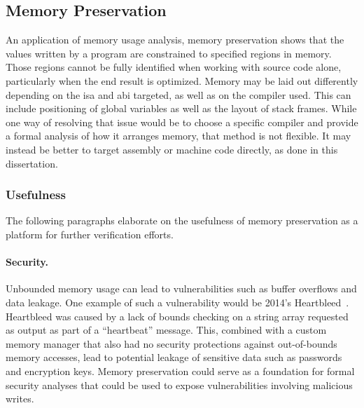 \subsection{Memory Preservation}
An application of memory usage analysis,
memory preservation shows that the values written by a program%
are constrained to specified regions in memory.
Those regions cannot be fully identified when working with source code alone,
particularly when the end result is optimized.
Memory may be laid out differently depending on the \ac{isa} and \ac{abi} targeted,
as well as on the compiler used.
This can include positioning of global variables
as well as the layout of stack frames.
While one way of resolving that issue would be to choose a specific compiler
and provide a formal analysis of how it arranges memory, that method is not flexible.
It may instead be better to target assembly or machine code directly,
as done in this dissertation.

\subsubsection{Usefulness}
The following paragraphs elaborate on the usefulness of memory preservation
as a platform for further verification efforts.

\paragraph{Security.}
Unbounded memory usage can lead to vulnerabilities
such as buffer overflows and data leakage.
One example of such a vulnerability would be 2014's Heartbleed~\citep{heartbleed}.
Heartbleed was caused by a lack of bounds checking on a string array
requested as output as part of a ``heartbeat'' message.
This, combined with a custom memory manager
that also had no security protections against out-of-bounds memory accesses,
lead to potential leakage of sensitive data such as passwords and encryption keys.
Memory preservation could serve as a foundation for formal security analyses
that could be used to expose vulnerabilities involving malicious writes.

